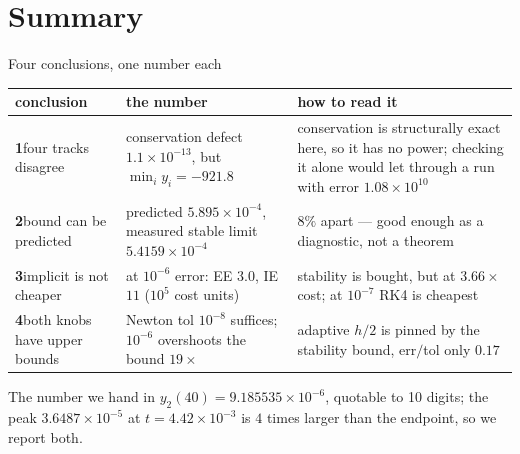 \documentclass[aspectratio=169,10pt]{beamer}
\begin{document}
\section{Summary}

\begin{frame}{Four conclusions, one number each}
  \begin{center}
  {\footnotesize
  \setlength{\tabcolsep}{5pt}%
  \begin{tabular}{@{}L{2.6cm}L{4.8cm}L{6.4cm}@{}}
    \toprule
    conclusion & the number & how to read it \\
    \midrule
    \textbf{1}\quad four tracks disagree
      & conservation defect $1.1\times10^{-13}$, but $\min_i y_i=-921.8$
      & conservation is structurally exact here, so it has no power; checking it
        alone would let through a run with error $1.08\times10^{10}$ \\
    \addlinespace
    \textbf{2}\quad bound can be predicted
      & predicted $5.895\times10^{-4}$, measured stable limit $5.4159\times10^{-4}$
      & $8\%$ apart --- good enough as a diagnostic, not a theorem \\
    \addlinespace
    \textbf{3}\quad implicit is not cheaper
      & at $10^{-6}$ error: EE $3.0$, IE $11$ ($10^{5}$ cost units)
      & stability is bought, but at $3.66\times$ cost; at $10^{-7}$ RK4 is
        cheapest \\
    \addlinespace
    \textbf{4}\quad both knobs have upper bounds
      & Newton tol $10^{-8}$ suffices; $10^{-6}$ overshoots the bound $19\times$
      & adaptive $h/2$ is pinned by the stability bound, err$/$tol only
        $0.17$ \\
    \bottomrule
  \end{tabular}}
  \end{center}

  \vspace{0.3em}
  \begin{exampleblock}{The number we hand in}
    \footnotesize
    $y_2(40)=9.185535\times10^{-6}$, quotable to \alert{10 digits};
    the peak $3.6487\times10^{-5}$ at $t=4.42\times10^{-3}$ is $4$ times larger
    than the endpoint, so we report both.
  \end{exampleblock}
\end{frame}
\end{document}
